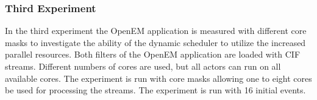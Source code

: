 \subsubsection{Third Experiment}
\label{subsubsec:third-experiment}
In the third experiment the OpenEM application is measured with different core masks to investigate the ability of the dynamic scheduler to utilize the increased parallel resources. Both filters of the OpenEM application are loaded with CIF streams. Different numbers of cores are used, but all actors can run on all available cores. The experiment is run with core masks allowing one to eight cores be used for processing the streams. The experiment is run with 16 initial events.
